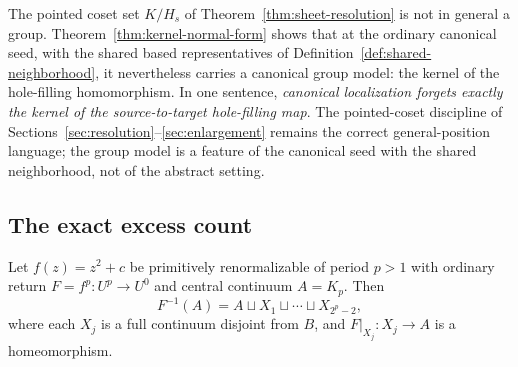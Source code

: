 \begin{remark}\label{rem:kernel-interpretation}
The pointed coset set $K/H_s$ of
Theorem~\ref{thm:sheet-resolution} is not in general a group.
Theorem~\ref{thm:kernel-normal-form} shows that at the ordinary
canonical seed, with the shared based representatives of
Definition~\ref{def:shared-neighborhood}, it nevertheless carries a
canonical group model: the kernel of the hole-filling homomorphism.
In one sentence, \emph{canonical localization forgets exactly the
kernel of the source-to-target hole-filling map}.  The pointed-coset
discipline of Sections~\ref{sec:resolution}--\ref{sec:enlargement}
remains the correct general-position language; the group model is a
feature of the canonical seed with the shared neighborhood, not of the
abstract setting.
\end{remark}

\subsection{The exact excess count}

\begin{theorem}\label{thm:excess-count}
Let $f(z)=z^{2}+c$ be primitively renormalizable of period $p>1$ with
ordinary return $F=f^{p}\colon U^{p}\to U^{0}$ and central continuum
$A=K_p$.  Then
\[
 F^{-1}(A)=A\sqcup X_1\sqcup\cdots\sqcup X_{2^{p}-2},
\]
where each $X_j$ is a full continuum disjoint from $B$, and
$F|_{X_j}\colon X_j\to A$ is a homeomorphism.
\end{theorem}

